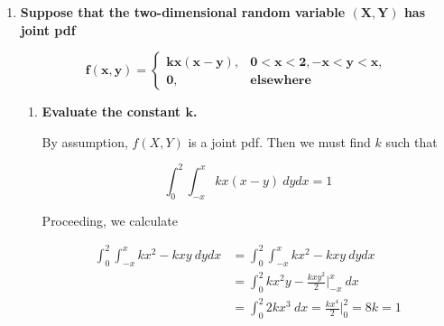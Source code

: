 \documentclass[10pt, oneside]{article}
\begin{document}
\begin{enumerate}[label=6.\arabic*]
\begin{align*}
P(X = 1 | Y = 1) &= \frac{P(X = 1, Y = 1)}{P(Y = 1)} = \frac{1/12}{3/12} = \boxed{1/3} \\
P(X = 2 | Y = 1) &= \frac{P(X = 2, Y = 1)}{P(Y = 1)} = \frac{1/6}{3/12} = \boxed{2/3} \\
P(X = 3 | Y = 1) &= \frac{P(X = 3, Y = 1)}{P(Y = 1)} = \boxed{0} \\
P(X = 1 | Y = 2) &= \frac{P(X = 1, Y = 2)}{P(Y = 2)} = \boxed{0} \\
P(X = 2 | Y = 2) &= \frac{P(X = 2, Y = 2)}{P(Y = 2)} = \frac{1/9}{14/45} = \boxed{5/14} \\
P(X = 3 | Y = 2) &= \frac{P(X = 3, Y = 2)}{P(Y = 2)} = \frac{1/5}{14/45} = \boxed{9/14} \\
P(X = 1 | Y = 3) &= \frac{P(X = 1, Y = 3)}{P(Y = 3)} = \frac{1/18}{79/180} = \boxed{10/79} \\
P(X = 2 | Y = 3) &= \frac{P(X = 2, Y = 3)}{P(Y = 3)} = \frac{1/4}{79/180} = \boxed{45/79} \\
P(X = 3 | Y = 3) &= \frac{P(X = 3, Y = 3)}{P(Y = 3)} = \frac{2/15}{79/180} = \boxed{24/79}
\end{align*}

\newpage
\item  \begin{tcolorbox}[
  colback=Cerulean!5!white,
  colframe=Cerulean!75!black]
\textbf{Suppose that the two-dimensional random variable $\bm{(X,Y)}$ has joint pdf}

\[ \bm{f(x,y) = } \begin{cases} \bm{kx(x-y)}, & \bm{0 < x < 2, -x < y < x,} \\
\bm{0}, & \textbf{elsewhere}
\end{cases} \]
\end{tcolorbox}

	\begin{enumerate}
	\item  \begin{tcolorbox}[
	  colback=Cerulean!5!white,
	  colframe=Cerulean!75!black]
	\textbf{Evaluate the constant $\bm{k}$.}
	\end{tcolorbox}
	
	By assumption, $f(X, Y)$ is a joint pdf. Then we must find $k$ such that
	
	\[ \int^2_0 \int^x_{-x} kx(x-y) \ dy dx = 1 \]
	
	Proceeding, we calculate
	
	\begin{align*}
	\int^2_0 \int^x_{-x} kx^2 - kxy \ dy dx &= \int^2_0 \int^x_{-x} kx^2 - kxy \ dy dx \\
	&= \int^2_0 kx^2 y - \frac{kxy^2}{2} \Big|^x_{-x} \ dx \\
	&= \int^2_0 2kx^3 \ dx = \frac{kx^4}{2} \Big|^2_0 = 8k = 1
	\end{align*}
	

\end{enumerate}
\end{enumerate}
\end{document}
